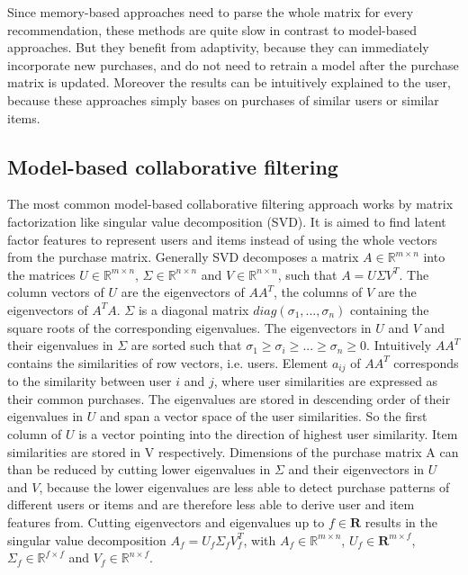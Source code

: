 \documentclass[10pt]{reportMaster}
\begin{document}
Since memory-based approaches need to parse the whole matrix for every recommendation, these methods are quite slow in contrast to model-based approaches.
But they benefit from adaptivity, because they can immediately incorporate new purchases, and do not need to retrain a model after the purchase matrix is updated.
Moreover the results can be intuitively explained to the user, because these approaches simply bases on purchases of similar users or similar items.

\subsection{Model-based collaborative filtering}
The most common model-based collaborative filtering approach works by matrix factorization like singular value decomposition (SVD).
It is aimed to find latent factor features to represent users and items instead of using the whole vectors from the purchase matrix.
Generally SVD decomposes a matrix $A \in \mathds{R}^{m \times n}$ into the matrices $U \in \mathds{R}^{m \times n}$, $\Sigma \in \mathds{R}^{n \times n}$ and $V \in \mathds{R}^{n \times n}$, such that $A = U \Sigma V^T$.
The column vectors of $U$ are the eigenvectors of $AA^T$, the columns of $V$ are the eigenvectors of $A^TA$.
$\Sigma$ is a diagonal matrix $diag(\sigma_1, ..., \sigma_n)$ containing the square roots of the corresponding eigenvalues.  %
The eigenvectors in $U$ and $V$ and their eigenvalues in $\Sigma$ are sorted such that $\sigma_1 \geq \sigma_i \geq ... \geq \sigma_n \geq 0$.
Intuitively $AA^T$ contains the similarities of row vectors, i.e. users.
Element $a_{ij}$ of $AA^T$ corresponds to the similarity between user $i$ and $j$, where user similarities are expressed as their common purchases.
The eigenvalues are stored in descending order of their eigenvalues in $U$ and span a vector space of the user similarities.
So the first column of $U$ is a vector pointing into the direction of highest user similarity. %
Item similarities are stored in V respectively.
Dimensions of the purchase matrix A can than be reduced by cutting lower eigenvalues in $\Sigma$ and their eigenvectors in $U$ and $V$, because the lower eigenvalues are less able to detect purchase patterns of different users or items and are therefore less able to derive user and item features from.
Cutting eigenvectors and eigenvalues up to $f \in \mathbf{R}$ results in the singular value decomposition $A_f = U_f \Sigma_f V_f^T$, with $A_f \in \mathds{R}^{m \times n}$, $U_f \in \mathbf{R}^{m \times f}$, $\Sigma_f \in \mathds{R}^{f \times f}$ and $V_f \in \mathds{R}^{n \times f}$.
\end{document}
